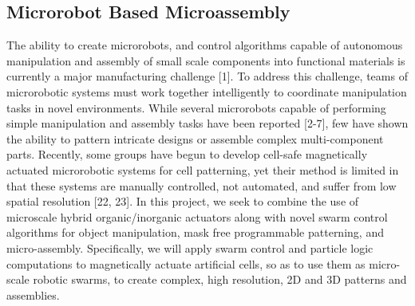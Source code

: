 \subsection{Microrobot Based Microassembly}
The ability to create microrobots, and control algorithms capable of autonomous manipulation and assembly of small scale components into functional materials is currently a major manufacturing challenge [1]. To address this challenge, teams of microrobotic systems must work together intelligently to coordinate manipulation tasks in novel environments. While several microrobots capable of performing simple manipulation and assembly tasks have been reported [2-7], few have shown the ability to pattern intricate designs or assemble complex multi-component parts. Recently, some groups have begun to develop cell-safe magnetically actuated microrobotic systems for cell patterning, yet their method is limited in that these systems are manually controlled, not automated, and suffer from low spatial resolution [22, 23]. In this project, we seek to combine the use of microscale hybrid organic/inorganic actuators along with novel swarm control algorithms for object manipulation, mask free programmable patterning, and micro-assembly. Specifically, we will apply swarm control and particle logic computations to magnetically actuate artificial cells, so as to use them as micro-scale robotic swarms, to create complex, high resolution, 2D and 3D patterns and assemblies.
